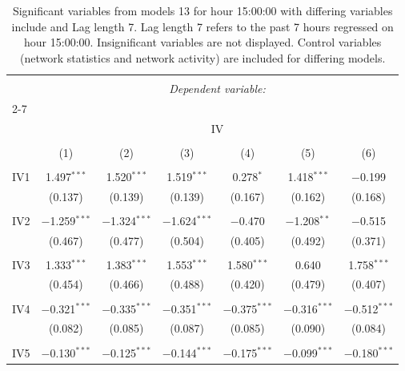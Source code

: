 
\begin{table}[!htbp] \centering 
  \caption{Significant variables from models 13 for hour 15:00:00 with differing variables include 
                               and Lag length 7. Lag length 7 refers to the past 7 hours regressed on hour 15:00:00. 
                               Insignificant variables are not displayed. 
                               Control variables (network statistics and network activity) are 
                               included for differing models.} 
  \label{IVmodels1_t_hourlagged2} 
\scriptsize 
\begin{tabular}{@{\extracolsep{5pt}}lcccccc} 
\\[-1.8ex]\hline 
\hline \\[-1.8ex] 
 & \multicolumn{6}{c}{\textit{Dependent variable:}} \\ 
\cline{2-7} 
\\[-1.8ex] & \multicolumn{6}{c}{IV} \\ 
\\[-1.8ex] & (1) & (2) & (3) & (4) & (5) & (6)\\ 
\hline \\[-1.8ex] 
 IV1 & 1.497$^{***}$ & 1.520$^{***}$ & 1.519$^{***}$ & 0.278$^{*}$ & 1.418$^{***}$ & $-$0.199 \\ 
  & (0.137) & (0.139) & (0.139) & (0.167) & (0.162) & (0.168) \\ 
  & & & & & & \\ 
 IV2 & $-$1.259$^{***}$ & $-$1.324$^{***}$ & $-$1.624$^{***}$ & $-$0.470 & $-$1.208$^{**}$ & $-$0.515 \\ 
  & (0.467) & (0.477) & (0.504) & (0.405) & (0.492) & (0.371) \\ 
  & & & & & & \\ 
 IV3 & 1.333$^{***}$ & 1.383$^{***}$ & 1.553$^{***}$ & 1.580$^{***}$ & 0.640 & 1.758$^{***}$ \\ 
  & (0.454) & (0.466) & (0.488) & (0.420) & (0.479) & (0.407) \\ 
  & & & & & & \\ 
 IV4 & $-$0.321$^{***}$ & $-$0.335$^{***}$ & $-$0.351$^{***}$ & $-$0.375$^{***}$ & $-$0.316$^{***}$ & $-$0.512$^{***}$ \\ 
  & (0.082) & (0.085) & (0.087) & (0.085) & (0.090) & (0.084) \\ 
  & & & & & & \\ 
 IV5 & $-$0.130$^{***}$ & $-$0.125$^{***}$ & $-$0.144$^{***}$ & $-$0.175$^{***}$ & $-$0.099$^{***}$ & $-$0.180$^{***}$ \\ 

\end{tabular}
\end{table}
